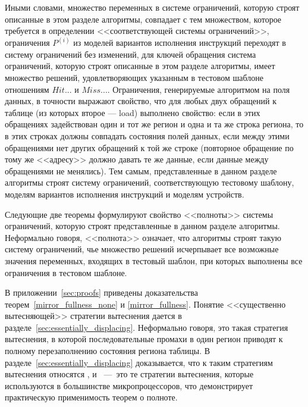 
Иными словами, множество переменных в системе ограничений, которую строят описанные в этом разделе алгоритмы, совпадает с тем множеством, которое требуется в определении <<соответствующей системы ограничений>>, ограничения $P^{(i)}$ из моделей вариантов исполнения инструкций переходят в систему ограничений без изменений, для ключей обращения система ограничений, которую строят описанные в этом разделе алгоритмы, имеет множество решений, удовлетворяющих указанным в тестовом шаблоне отношениям $Hit...$ и $Miss...$. Ограничения, генерируемые алгоритмом на поля данных, в точности выражают свойство, что для любых двух обращений к таблице (из которых второе --- load) выполнено свойство: если в этих обращениях задействован один и тот же регион и одна и та же строка региона, то в этих строках должны совпадать состояния полей данных, если между этими обращениями нет других обращений к той же строке (повторное обращение по тому же <<адресу>> должно давать те же данные, если данные между обращениями не менялись). Тем самым, представленные в данном разделе алгоритмы строят систему ограничений, соответствующую тестовому шаблону, моделям вариантов исполнения инструкций и моделям устройств.

Следующие две теоремы формулируют свойство <<полноты>> системы ограничений, которую строят представленные в данном разделе алгоритмы. Неформально говоря, <<полнота>> означает, что алгоритмы строят такую систему ограничений, чье множество решений исчерпывает все возможные значения переменных, входящих в тестовый шаблон, при которых выполнены все ограничения в тестовом шаблоне.

\begin{theorem}\label{mirror_fullness_none}
\FullnessMirrorNone
\end{theorem}

\begin{theorem}\label{mirror_fullness}
\FullnessMirror
\end{theorem}

В приложении~\ref{sec:proofs} приведены доказательства теорем~\ref{mirror_fullness_none} и \ref{mirror_fullness}. Понятие <<существенно вытесняющей>> стратегии вытеснения дается в разделе~\ref{sec:essentially_displacing}. Неформально говоря, это такая стратегия вытеснения, в которой последовательные промахи в один регион приводят к полному перезаполнению состояния региона таблицы. В разделе~\ref{sec:essentially_displacing} доказывается, что к таким стратегиям вытеснения относятся \LRU, \FIFO и \PseudoLRU~---~это те стратегии вытеснения, которые используются в большинстве микропроцессоров, что демонстрирует практическую применимость теорем о полноте.


